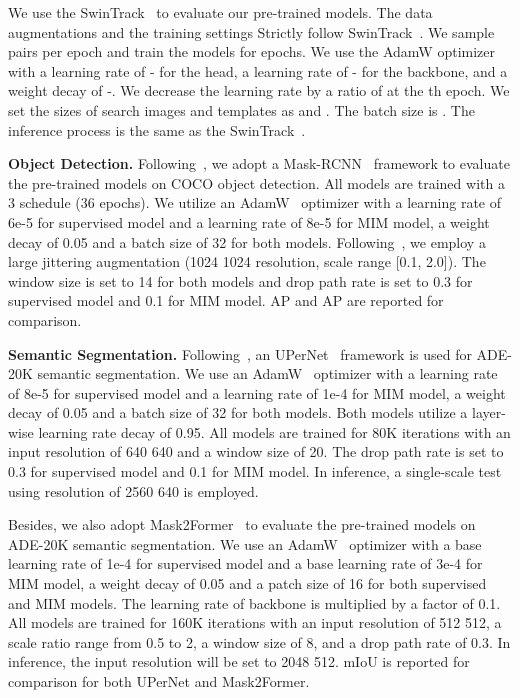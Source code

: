 \documentclass{article}
\begin{document}
	We use the SwinTrack~\cite{lin2021swintrack} to evaluate our pre-trained models. The data augmentations and the training settings Strictly follow SwinTrack~\cite{lin2021swintrack}. 
	We sample  pairs per epoch and train the models for  epochs. We use the AdamW optimizer with a learning rate of - for the head, a learning rate of - for the backbone, and a weight decay of -. We decrease the learning rate by a ratio of  at the th epoch. We set the sizes of search images and templates as  and . The batch size is . The inference process is the same as the SwinTrack~\cite{lin2021swintrack}.
	
	\noindent\textbf{Object Detection.} Following~\cite{xie2021simmim}, we adopt a Mask-RCNN~\cite{Mask-rcnn} framework to evaluate the pre-trained models on COCO object detection. All models are trained with a 3 schedule (36 epochs). We utilize an AdamW~\cite{kingma2014adam} optimizer with a learning rate of 6e-5 for supervised model and a learning rate of 8e-5 for MIM model, a weight decay of 0.05 and a batch size of 32 for both models. Following~\cite{simple_copy_paste,liu2021swin}, we employ a large jittering augmentation (1024  1024 resolution, scale range [0.1, 2.0]). The window size is set to 14 for both models and drop path rate is set to 0.3 for supervised model and 0.1 for MIM model. AP and AP are reported for comparison.
	
	\noindent\textbf{Semantic Segmentation.} Following~\cite{liu2021swin}, an UPerNet~\cite{xiao2018upernet} framework is used for ADE-20K semantic segmentation. We use an AdamW~\cite{kingma2014adam} optimizer with a learning rate of 8e-5 for supervised model and a learning rate of 1e-4 for MIM model, a weight decay of 0.05 and a batch size of 32 for both models. Both models utilize a layer-wise learning rate decay of 0.95. All models are trained for 80K iterations with an input resolution of 640  640 and a window size of 20. The drop path rate is set to 0.3 for supervised model and 0.1 for MIM model.  In inference, a single-scale test using resolution of 2560  640 is employed.
	
	Besides, we also adopt Mask2Former~\cite{mask2former} to evaluate the pre-trained models on ADE-20K semantic segmentation. We use an AdamW~\cite{kingma2014adam} optimizer with a base learning rate of 1e-4 for supervised model and a base learning rate of 3e-4 for MIM model, a weight decay of 0.05 and a patch size of 16 for both supervised and MIM models. The learning rate of backbone is multiplied by a factor of 0.1. All models are trained for 160K iterations with an input resolution of 512  512, a scale ratio range from 0.5 to 2, a window size of 8, and a drop path rate of 0.3. In inference, the input resolution will be set to 2048  512. mIoU is reported for comparison for both UPerNet and Mask2Former.
    
\end{document}
